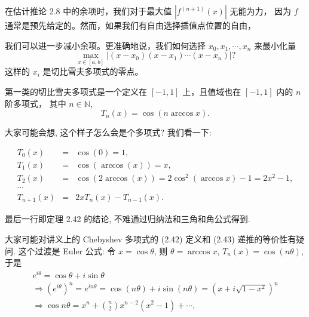 \documentclass[a4paper]{ctexart}
\newcommand{\remark}[1]
{\noindent {\bf Remark {#1}}}
\begin{document}
 在估计推论 2.8 中的余项时，我们对于最大值 $|f^{(n+1)}(x)|$ 无能为力，
因为 $f$ 通常是预先给定的。然而，如果我们有自由选择插值点位置的自由，
{我们可以进一步减小余项。更准确地说，我们如何选择 $x_0, x_1, \cdots, x_n$ 来最小化量
\[
\max_{x \in [a,b]} |(x - x_0)(x - x_1) \cdots (x - x_n)|?
\]
这样的 $x_i$ 是切比雪夫多项式的零点。






 第一类的切比雪夫多项式是一个定义在 $[-1, 1]$ 上，且值域也在 $[-1, 1]$ 内的 $n$ 阶多项式，
其中 $n \in \mathbb{N}$,
\[
T_n(x) = \cos(n \arccos x). \tag{2.41}
\]

大家可能会想, 这个样子怎么会是个多项式? 我们看一下:

$$
\begin{array}{rcl}
  T_0(x) &=& \cos(0) = 1, \\
  T_1(x) &=& \cos(\arccos(x)) = x, \\
  T_2(x) &=& \cos(2 \arccos(x)) = 2 \cos^2 (\arccos x) - 1 = 2 x^2 - 1, \\
  \cdots && \\
  T_{n + 1}(x) &=& 2 x T_n(x) - T_{n - 1}(x).
\end{array}
$$

最后一行即定理 2.42 的结论, 不难通过归纳法和三角和角公式得到.

\remark{2.33} 大家可能对讲义上的 Chebyshev 多项式的 (2.42) 定义和 (2.43) 
递推的等价性有疑问. 这个过渡是 Euler 公式: 令 $x = \cos \theta$, 则
$\theta = \arccos x$, $T_n(x) = \cos(n\theta)$, 于是
$$
\begin{array}{r}
  e^{i\theta} = \cos \theta + i \sin \theta \\
\Rightarrow \left(e^{i \theta}\right)^n = e^{in\theta} = \cos(n\theta) + i\sin(n\theta)
= \left(x + i \sqrt{1 - x^2}\right)^n \\
\Rightarrow \cos n\theta = x^n + {n \choose 2} x^{n - 2}(x^2 - 1) + \cdots, \\
\end{array}
$$

}
\end{document}
